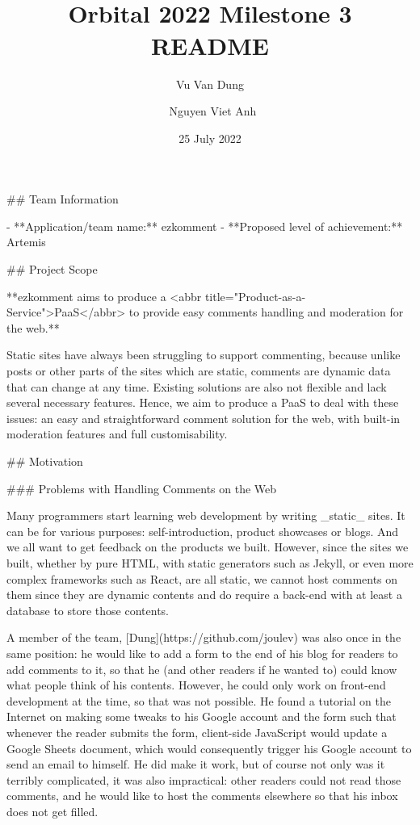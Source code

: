 \documentclass[11pt]{article}
\title{\\[1cm]\bfseries Orbital 2022 Milestone 3 README}
\author{Vu Van Dung \and\ Nguyen Viet Anh}
\date{25 July 2022}
\begin{document}
\maketitle
\tableofcontents
\setlength\parindent{0pt}
\setlength\parskip{1em}
\begin{markdown}
## Team Information

- **Application/team name:** ezkomment
- **Proposed level of achievement:** Artemis

## Project Scope

**ezkomment aims to produce a <abbr title="Product-as-a-Service">PaaS</abbr> to provide easy comments handling and moderation for the web.**

Static sites have always been struggling to support commenting, because unlike posts or other parts of the sites which are static, comments are dynamic data that can change at any time. Existing solutions are also not flexible and lack several necessary features. Hence, we aim to produce a PaaS to deal with these issues: an easy and straightforward comment solution for the web, with built-in moderation features and full customisability.

## Motivation

### Problems with Handling Comments on the Web

Many programmers start learning web development by writing _static_ sites. It can be for various purposes: self-introduction, product showcases or blogs. And we all want to get feedback on the products we built. However, since the sites we built, whether by pure HTML, with static generators such as Jekyll, or even more complex frameworks such as React, are all static, we cannot host comments on them since they are dynamic contents and do require a back-end with at least a database to store those contents.

A member of the team, [Dung](https://github.com/joulev) was also once in the same position: he would like to add a form to the end of his blog for readers to add comments to it, so that he (and other readers if he wanted to) could know what people think of his contents. However, he could only work on front-end development at the time, so that was not possible. He found a tutorial on the Internet on making some tweaks to his Google account and the form such that whenever the reader submits the form, client-side JavaScript would update a Google Sheets document, which would consequently trigger his Google account to send an email to himself. He did make it work, but of course not only was it terribly complicated, it was also impractical: other readers could not read those comments, and he would like to host the comments elsewhere so that his inbox does not get filled.


\end{markdown}
\end{document}
